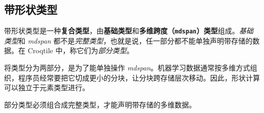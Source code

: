 \subsection*{带形状类型}

带形状类型是一种\textbf{复合类型}，由\textbf{基础类型}和\textbf{多维跨度（\texttt{mdspan}）类型}组成。\emph{基础类型}和 \emph{mdspan} 都不是\emph{完整类型}，也就是说，任一部分都不能单独声明带存储的数据。在 Croqtile 中，称它们为\emph{部分类型}。

将类型分为两部分，是为了能单独操作 \emph{mdspan}。机器学习数据通常按多维方式组织，程序员经常要把它切成更小的分块，让分块跨存储层次移动。因此，形状计算可以独立于元素类型进行。

部分类型必须组合成完整类型，才能声明带存储的多维数据。
